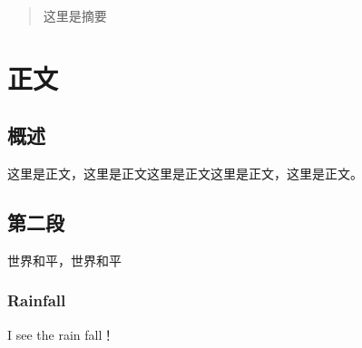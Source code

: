 \documentclass[12pt,hyperref,a4paper,UTF8]{ctexart}
\begin{document}
\cover
\thispagestyle{empty} %

\newpage

\begin{abstract}

这里是摘要

\end{abstract}

 




\setcounter{section}{1}
\section*{正文}
\renewcommand{\thesubsection}{\arabic{subsection}} 

\subsection{概述}

这里是正文，这里是正文这里是正文这里是正文，这里是正文。

\subsection{第二段}
世界和平，世界和平
\subsubsection{Rainfall}
I see the rain fall！







\end{document}
